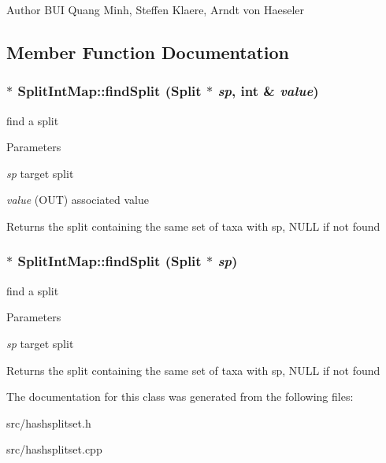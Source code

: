 \begin{DoxyAuthor}{Author}
BUI Quang Minh, Steffen Klaere, Arndt von Haeseler 
\end{DoxyAuthor}


\subsection{Member Function Documentation}
\hypertarget{classSplitIntMap_abb18e331d550b889839b0f6427636512}{
\subsubsection[{findSplit}]{ $\ast$ SplitIntMap::findSplit ({\bf Split} $\ast$ {\em sp}, \/  int \& {\em value})}}
\label{classSplitIntMap_abb18e331d550b889839b0f6427636512}
find a split 
\begin{DoxyParams}{Parameters}
\item[{\em sp}]target split \item[{\em value}](OUT) associated value \end{DoxyParams}
\begin{DoxyReturn}{Returns}
the split containing the same set of taxa with sp, NULL if not found 
\end{DoxyReturn}
\hypertarget{classSplitIntMap_ae86934b3eb2efeafda55f0e6a26bec09}{
\subsubsection[{findSplit}]{ $\ast$ SplitIntMap::findSplit ({\bf Split} $\ast$ {\em sp})}}
\label{classSplitIntMap_ae86934b3eb2efeafda55f0e6a26bec09}
find a split 
\begin{DoxyParams}{Parameters}
\item[{\em sp}]target split \end{DoxyParams}
\begin{DoxyReturn}{Returns}
the split containing the same set of taxa with sp, NULL if not found 
\end{DoxyReturn}


The documentation for this class was generated from the following files:\begin{DoxyCompactItemize}
\item 
src/hashsplitset.h\item 
src/hashsplitset.cpp\end{DoxyCompactItemize}
